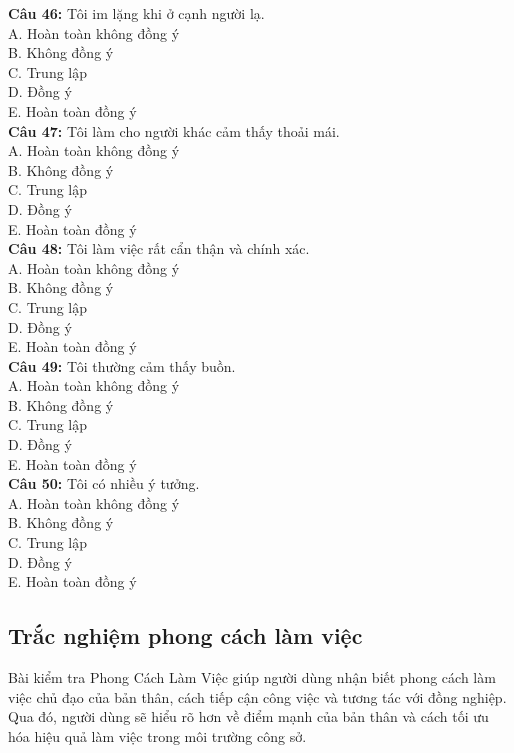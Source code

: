 \begin{multicols}{2}
\textbf{Câu 46:} Tôi im lặng khi ở cạnh người lạ. \\
A. Hoàn toàn không đồng ý \\
B. Không đồng ý \\
C. Trung lập \\
D. Đồng ý \\
E. Hoàn toàn đồng ý \\

\textbf{Câu 47:} Tôi làm cho người khác cảm thấy thoải mái. \\
A. Hoàn toàn không đồng ý \\
B. Không đồng ý \\
C. Trung lập \\
D. Đồng ý \\
E. Hoàn toàn đồng ý \\

\textbf{Câu 48:} Tôi làm việc rất cẩn thận và chính xác. \\
A. Hoàn toàn không đồng ý \\
B. Không đồng ý \\
C. Trung lập \\
D. Đồng ý \\
E. Hoàn toàn đồng ý \\

\textbf{Câu 49:} Tôi thường cảm thấy buồn. \\
A. Hoàn toàn không đồng ý \\
B. Không đồng ý \\
C. Trung lập \\
D. Đồng ý \\
E. Hoàn toàn đồng ý \\

\textbf{Câu 50:} Tôi có nhiều ý tưởng. \\
A. Hoàn toàn không đồng ý \\
B. Không đồng ý \\
C. Trung lập \\
D. Đồng ý \\
E. Hoàn toàn đồng ý \\
\end{multicols}

\subsection{Trắc nghiệm phong cách làm việc}

Bài kiểm tra Phong Cách Làm Việc giúp người dùng nhận biết phong cách làm việc chủ đạo của bản thân, cách tiếp cận công việc và tương tác với đồng nghiệp. Qua đó, người dùng sẽ hiểu rõ hơn về điểm mạnh của bản thân và cách tối ưu hóa hiệu quả làm việc trong môi trường công sở.


